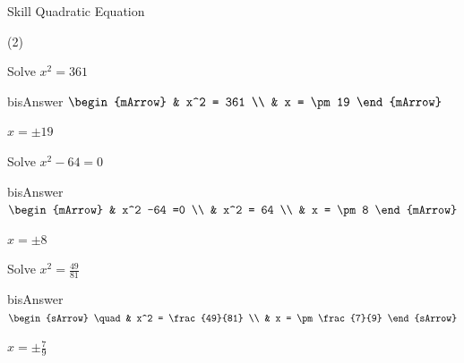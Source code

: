 \clearpage\noindent%
\begin{boxSkill}{Skill \thenskill \quad Quadratic Equation}
    \begin{subtask}(2)
      \task[] \begin{exercise} Solve $x^2=361$
              \begin{envOut}[height=3cm]{bisAnswer}
			     $\begin{mArrow}
			                & x^2 = 361      \\
                            & x = \pm 19
				  \end{mArrow}$
               \begin{shortsolution}  
				       $x = \pm 19$
			   \end{shortsolution}				 
               \end{envOut}
         \end{exercise}

      \task[] \begin{exercise} Solve $x^2-64=0$
              \begin{envOut}[height=3cm]{bisAnswer}
			     $\begin{mArrow}
			                & x^2 -64 =0      \\
			                & x^2  = 64      \\
                            & x = \pm 8
				  \end{mArrow}$
               \begin{shortsolution}  
				       $x = \pm 8$
			   \end{shortsolution}				 
               \end{envOut}
         \end{exercise}

      \task[] \begin{exercise} Solve $x^2=\frac{49}{81}$
              \begin{envOut}[height=3cm]{bisAnswer}
			      $\begin{sArrow}
			          \quad & x^2 = \frac{49}{81}      \\
                            & x = \pm \frac{7}{9}					  
				  \end{sArrow}$
                  \begin{shortsolution}  
				       $x = \pm \frac{7}{9} $
			      \end{shortsolution}				 
               \end{envOut}
         \end{exercise}


\end{subtask}
\end{boxSkill}
